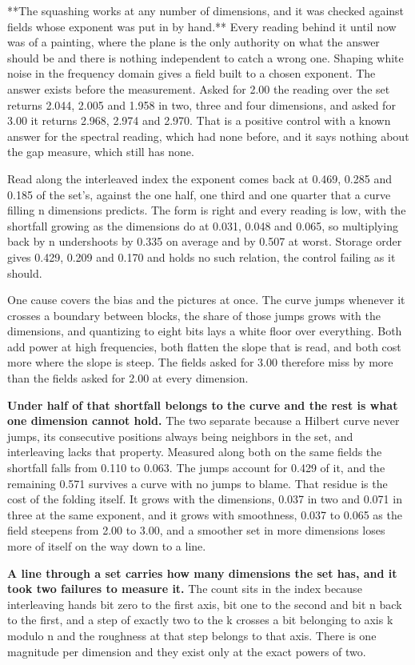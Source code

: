 **The squashing works at any number of dimensions, and it was checked against fields whose exponent was put in by hand.** Every reading behind it until now was of a painting, where the plane is the only authority on what the answer should be and there is nothing independent to catch a wrong one. Shaping white noise in the frequency domain gives a field built to a chosen exponent. The answer exists before the measurement. Asked for 2.00 the reading over the set returns 2.044, 2.005 and 1.958 in two, three and four dimensions, and asked for 3.00 it returns 2.968, 2.974 and 2.970. That is a positive control with a known answer for the spectral reading, which had none before, and it says nothing about the gap measure, which still has none.

Read along the interleaved index the exponent comes back at 0.469, 0.285 and 0.185 of the set's, against the one half, one third and one quarter that a curve filling n dimensions predicts. The form is right and every reading is low, with the shortfall growing as the dimensions do at 0.031, 0.048 and 0.065, so multiplying back by n undershoots by 0.335 on average and by 0.507 at worst. Storage order gives 0.429, 0.209 and 0.170 and holds no such relation, the control failing as it should.

One cause covers the bias and the pictures at once. The curve jumps whenever it crosses a boundary between blocks, the share of those jumps grows with the dimensions, and quantizing to eight bits lays a white floor over everything. Both add power at high frequencies, both flatten the slope that is read, and both cost more where the slope is steep. The fields asked for 3.00 therefore miss by more than the fields asked for 2.00 at every dimension.

\textbf{Under half of that shortfall belongs to the curve and the rest is what one dimension cannot hold.} The two separate because a Hilbert curve never jumps, its consecutive positions always being neighbors in the set, and interleaving lacks that property. Measured along both on the same fields the shortfall falls from 0.110 to 0.063. The jumps account for 0.429 of it, and the remaining 0.571 survives a curve with no jumps to blame. That residue is the cost of the folding itself. It grows with the dimensions, 0.037 in two and 0.071 in three at the same exponent, and it grows with smoothness, 0.037 to 0.065 as the field steepens from 2.00 to 3.00, and a smoother set in more dimensions loses more of itself on the way down to a line.

\textbf{A line through a set carries how many dimensions the set has, and it took two failures to measure it.} The count sits in the index because interleaving hands bit zero to the first axis, bit one to the second and bit n back to the first, and a step of exactly two to the k crosses a bit belonging to axis k modulo n and the roughness at that step belongs to that axis. There is one magnitude per dimension and they exist only at the exact powers of two.

